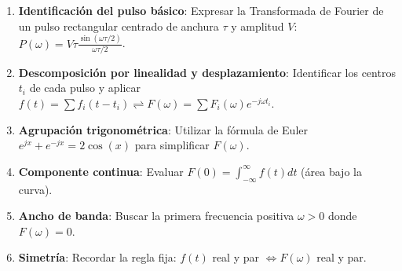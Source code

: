 \begin{mecanizado}
\begin{enumerate}
    \item \textbf{Identificación del pulso básico}: Expresar la Transformada de Fourier de un pulso rectangular centrado de anchura $\tau$ y amplitud $V$: $P(\omega) = V\tau \frac{\sin(\omega\tau/2)}{\omega\tau/2}$.
    \item \textbf{Descomposición por linealidad y desplazamiento}: Identificar los centros $t_i$ de cada pulso y aplicar $f(t) = \sum f_i(t - t_i) \rightleftharpoons F(\omega) = \sum F_i(\omega) e^{-j\omega t_i}$.
    \item \textbf{Agrupación trigonométrica}: Utilizar la fórmula de Euler $e^{jx} + e^{-jx} = 2\cos(x)$ para simplificar $F(\omega)$.
    \item \textbf{Componente continua}: Evaluar $F(0) = \int_{-\infty}^{\infty} f(t) dt$ (área bajo la curva).
    \item \textbf{Ancho de banda}: Buscar la primera frecuencia positiva $\omega > 0$ donde $F(\omega) = 0$.
    \item \textbf{Simetría}: Recordar la regla fija: $f(t)$ real y par $\iff F(\omega)$ real y par.
\end{enumerate}
\end{mecanizado}


